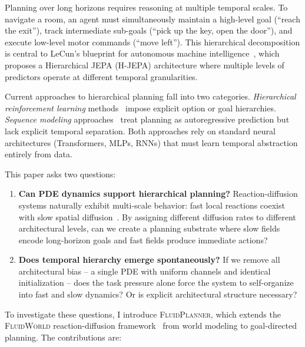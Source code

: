 \documentclass{article}
\newcommand{\fluidplanner}{\textsc{FluidPlanner}}
\newcommand{\fluidworld}{\textsc{FluidWorld}}
\begin{document}
Planning over long horizons requires reasoning at multiple temporal scales. To navigate a room, an agent must simultaneously maintain a high-level goal (``reach the exit''), track intermediate sub-goals (``pick up the key, open the door''), and execute low-level motor commands (``move left''). This hierarchical decomposition is central to LeCun's blueprint for autonomous machine intelligence~\cite{lecun2022path}, which proposes a Hierarchical JEPA (H-JEPA) architecture where multiple levels of predictors operate at different temporal granularities.

Current approaches to hierarchical planning fall into two categories. \emph{Hierarchical reinforcement learning} methods~\cite{nachum2018hiro,vezhnevets2017feudal,kulkarni2016hierarchical} impose explicit option or goal hierarchies. \emph{Sequence modeling} approaches~\cite{chen2021decisiontransformer,janner2021trajectory} treat planning as autoregressive prediction but lack explicit temporal separation. Both approaches rely on standard neural architectures (Transformers, MLPs, RNNs) that must learn temporal abstraction entirely from data.

This paper asks two questions:

\begin{enumerate}
    \item \textbf{Can PDE dynamics support hierarchical planning?} Reaction-diffusion systems naturally exhibit multi-scale behavior: fast local reactions coexist with slow spatial diffusion~\cite{turing1952chemical,cross1993pattern}. By assigning different diffusion rates to different architectural levels, can we create a planning substrate where slow fields encode long-horizon goals and fast fields produce immediate actions?
    \item \textbf{Does temporal hierarchy emerge spontaneously?} If we remove all architectural bias -- a single PDE with uniform channels and identical initialization -- does the task pressure alone force the system to self-organize into fast and slow dynamics? Or is explicit architectural structure necessary?
\end{enumerate}

To investigate these questions, I introduce \fluidplanner{}, which extends the \fluidworld{} reaction-diffusion framework~\cite{polly2026fluidworld} from world modeling to goal-directed planning. The contributions are:
\end{document}
